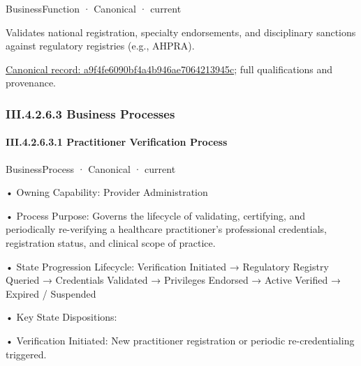 \label{element:a9f4fe6090bf4a4b946ae7064213945c}
{\small BusinessFunction · Canonical · current}\par

Validates national registration, specialty endorsements, and disciplinary sanctions against regulatory registries (e.g., AHPRA).


{\footnotesize \href{../../../../continuum/business/business-function/a9f4fe6090bf4a4b946ae7064213945c.md}{Canonical record: a9f4fe6090bf4a4b946ae7064213945c}; full qualifications and provenance.}\par
\subsubsection*{III.4.2.6.3 Business Processes}
\label{navigation:III.4.2.6.3}

\paragraph*{III.4.2.6.3.1 Practitioner Verification Process}
\label{navigation:III.4.2.6.3.1}

\label{element:32a3e1f948474d3aa77ca71bfa515f58}
{\small BusinessProcess · Canonical · current}\par

•
Owning Capability: Provider Administration



•
Process Purpose: Governs the lifecycle of validating, certifying, and periodically re-verifying a healthcare practitioner's professional credentials, registration status, and clinical scope of practice.



•
State Progression Lifecycle: Verification Initiated → Regulatory Registry Queried → Credentials Validated → Privileges Endorsed → Active Verified → Expired / Suspended



•
Key State Dispositions:



•
Verification Initiated: New practitioner registration or periodic re-credentialing triggered.



